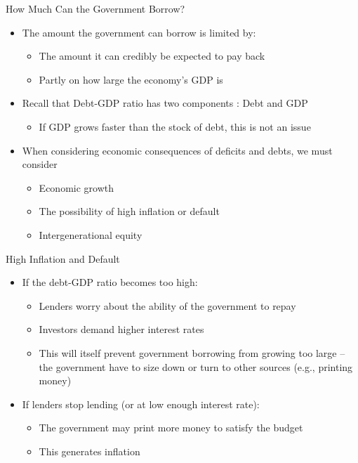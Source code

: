 \documentclass[aspectratio=1610]{beamer}
\begin{document}
\begin{frame}[wide]{How Much Can the Government Borrow?}
	\begin{itemize}
		\item The amount the government can borrow is limited by:
		\vspace{2mm}
		\begin{itemize}
			\item The amount it can credibly be expected to pay back
			\item Partly on how large the economy’s GDP is
		\end{itemize}
		\vspace{4mm}
		\item Recall that Debt-GDP ratio has two components	: Debt and GDP
		\vspace{2mm}
		\begin{itemize}
			\item If GDP grows faster than the stock of debt, this is not an issue
		\end{itemize}
		\vspace{4mm}
		\item When considering economic consequences of deficits and debts, we must consider
		\vspace{2mm}
		\begin{itemize}
			\item Economic growth
			\item The possibility of high inflation or default
			\item Intergenerational equity
		\end{itemize}
		
		
	\end{itemize}
\end{frame}

\begin{frame}[wide]{High Inflation and Default}
	\begin{itemize}
		\item If the debt-GDP ratio becomes too high:
		\vspace{2mm}
		\begin{itemize}
			\item Lenders worry about the ability of the government to repay
			\item Investors demand higher interest rates
			\item This will itself prevent government borrowing from growing too large -- the government have to size down or turn to other sources (e.g., printing money)
		\end{itemize} 
		\vspace{4mm}
		\item If lenders stop lending (or at low enough interest rate):
		\vspace{2mm}
		\begin{itemize}
			\item The government may print more money to satisfy the budget
			\item This generates inflation
		\end{itemize}
	\end{itemize}
\end{frame}
\end{document}
